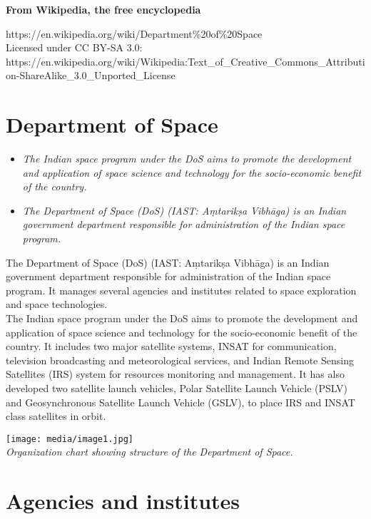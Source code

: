 \textbf{From Wikipedia, the free encyclopedia}

https://en.wikipedia.org/wiki/Department\%20of\%20Space\\
Licensed under CC BY-SA 3.0:\\
https://en.wikipedia.org/wiki/Wikipedia:Text\_of\_Creative\_Commons\_Attribution-ShareAlike\_3.0\_Unported\_License

\section{Department of Space}\label{department-of-space}

\begin{itemize}
\item
  \emph{The Indian space program under the DoS aims to promote the
  development and application of space science and technology for the
  socio-economic benefit of the country.}
\item
  \emph{The Department of Space (DoS) (IAST: Aṃtarikṣa Vibhāga) is an
  Indian government department responsible for administration of the
  Indian space program.}
\end{itemize}

The Department of Space (DoS) (IAST: Aṃtarikṣa Vibhāga) is an Indian
government department responsible for administration of the Indian space
program. It manages several agencies and institutes related to space
exploration and space technologies.\\
The Indian space program under the DoS aims to promote the development
and application of space science and technology for the socio-economic
benefit of the country. It includes two major satellite systems, INSAT
for communication, television broadcasting and meteorological services,
and Indian Remote Sensing Satellites (IRS) system for resources
monitoring and management. It has also developed two satellite launch
vehicles, Polar Satellite Launch Vehicle (PSLV) and Geosynchronous
Satellite Launch Vehicle (GSLV), to place IRS and INSAT class satellites
in orbit.

\texttt{[image: media/image1.jpg]}\\
\emph{Organization chart showing structure of the Department of Space.}

\section{Agencies and institutes}\label{agencies-and-institutes}

